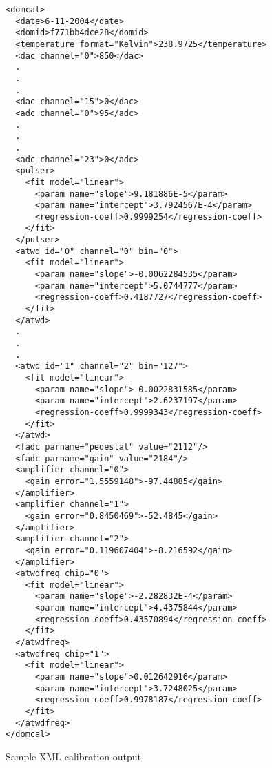\documentclass[10pt]{article}
\begin{document}
\begin{figure}
\begin{small}
\begin{verbatim}
<domcal>
  <date>6-11-2004</date>
  <domid>f771bb4dce28</domid>
  <temperature format="Kelvin">238.9725</temperature>
  <dac channel="0">850</dac>
  .
  .
  .
  <dac channel="15">0</dac>
  <adc channel="0">95</adc>
  .
  .
  .
  <adc channel="23">0</adc>
  <pulser>
    <fit model="linear">
      <param name="slope">9.181886E-5</param>
      <param name="intercept">3.7924567E-4</param>
      <regression-coeff>0.9999254</regression-coeff>
    </fit>
  </pulser>
  <atwd id="0" channel="0" bin="0">
    <fit model="linear">
      <param name="slope">-0.0062284535</param>
      <param name="intercept">5.0744777</param>
      <regression-coeff>0.4187727</regression-coeff>
    </fit>
  </atwd>
  .
  .
  .
  <atwd id="1" channel="2" bin="127">
    <fit model="linear">
      <param name="slope">-0.0022831585</param>
      <param name="intercept">2.6237197</param>
      <regression-coeff>0.9999343</regression-coeff>
    </fit>
  </atwd>
  <fadc parname="pedestal" value="2112"/>
  <fadc parname="gain" value="2184"/>
  <amplifier channel="0">
    <gain error="1.5559148">-97.44885</gain>
  </amplifier>
  <amplifier channel="1">
    <gain error="0.8450469">-52.4845</gain>
  </amplifier>
  <amplifier channel="2">
    <gain error="0.119607404">-8.216592</gain>
  </amplifier>
  <atwdfreq chip="0">
    <fit model="linear">
      <param name="slope">-2.282832E-4</param>
      <param name="intercept">4.4375844</param>
      <regression-coeff>0.43570894</regression-coeff>
    </fit>
  </atwdfreq>
  <atwdfreq chip="1">
    <fit model="linear">
      <param name="slope">0.012642916</param>
      <param name="intercept">3.7248025</param>
      <regression-coeff>0.9978187</regression-coeff>
    </fit>
  </atwdfreq>
</domcal>
\end{verbatim}
\end{small}
\caption{Sample XML calibration output}
\label{fig:xml}
\end{figure}
\end{document}
